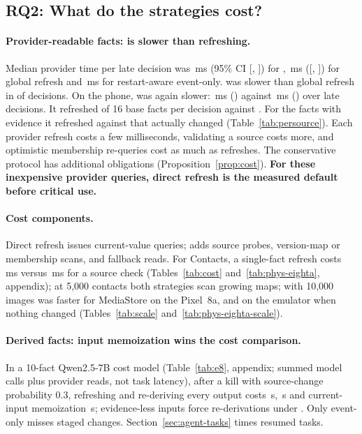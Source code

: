 \subsection{RQ2: What do the strategies cost?}
\label{sec:eval-cost}



\paragraph{Provider-readable facts: \stamp is slower than refreshing.} Median provider time per late decision was \CostLm\,ms (95\% CI [\CostLmLo, \CostLmHi]) for \stamp, \CostGl\,ms ([\CostGlLo, \CostGlHi]) for global refresh and \CostEvr\,ms for restart-aware event-only. \stamp was slower than global refresh in \CostSlowerPct of \CostN decisions. On the phone, \stamp was again slower: \PhysCostLm\,ms (\PhysCostLmCi) against \PhysCostGl\,ms (\PhysCostGlCi) over \PhysCostN late decisions. It refreshed \MeanLmRef of 16 base facts per decision against \MeanGlRef. For the \MeanNSup facts with evidence it refreshed \MeanLmRefSup against \MeanChgSup that actually changed (Table~\ref{tab:persource}). Each provider refresh costs a few milliseconds, validating a source costs more, and optimistic membership re-queries cost as much as refreshes. The conservative protocol has additional obligations (Proposition~\ref{prop:cost}). \textbf{For these inexpensive provider queries, direct refresh is the measured default before critical use.}

\paragraph{Cost components.} Direct refresh issues current-value queries; \stamp adds source probes, version-map or membership scans, and fallback reads. For Contacts, a single-fact refresh costs \CostRefContacts\,ms versus \CostValContacts\,ms for a source check (Tables~\ref{tab:cost} and~\ref{tab:phys-eighta}, appendix); at 5,000 contacts both strategies scan growing maps; with 10{,}000 images \stamp was faster for MediaStore on the Pixel~8a, and on the emulator when nothing changed (Tables~\ref{tab:scale} and~\ref{tab:phys-eighta-scale}).

\paragraph{Derived facts: input memoization wins the cost comparison.} In a 10-fact Qwen2.5-7B cost model (Table~\ref{tab:e8}, appendix; summed model calls plus provider reads, not task latency), after a kill with source-change probability 0.3, refreshing and re-deriving every output costs \EightGlKillHi\,s, \stamp \EightLmKillHi\,s and current-input memoization \EightMemoKillHi\,s; evidence-less inputs force re-derivations under \stamp. Only event-only misses staged changes. Section~\ref{sec:agent-tasks} times resumed tasks.

